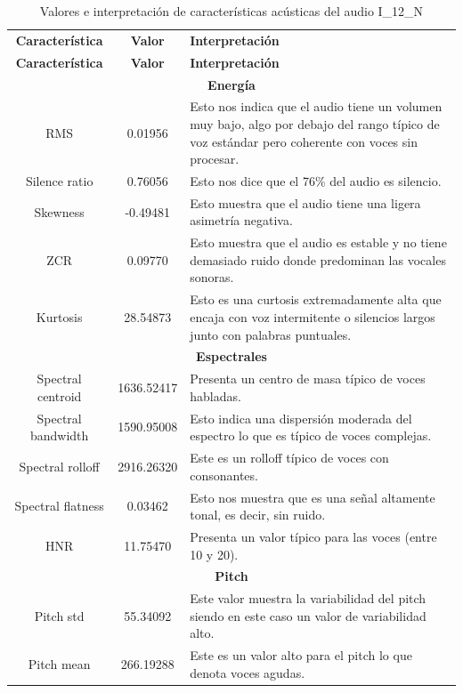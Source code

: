 \begin{longtable}{|c|c|p{8cm}|}
\caption{Características del audio y su interpretación}
\label{tab:caracteristicas_audio} \\
\caption{Valores e interpretación de características acústicas del audio I\_12\_N} \\
\hline
\textbf{Característica} & \textbf{Valor} & \textbf{Interpretación} \\ \hline
\endfirsthead

\hline
\textbf{Característica} & \textbf{Valor} & \textbf{Interpretación} \\ \hline
\endhead

\hline
\multicolumn{3}{|c|}{\textbf{Energía}} \\ \hline
RMS & 0.01956 & Esto nos indica que el audio tiene un volumen muy bajo, algo por debajo del rango típico de voz estándar pero coherente con voces sin procesar. \\ \hline
Silence ratio & 0.76056 & Esto nos dice que el 76\% del audio es silencio. \\ \hline
Skewness & -0.49481 & Esto muestra que el audio tiene una ligera asimetría negativa. \\ \hline
ZCR & 0.09770 & Esto muestra que el audio es estable y no tiene demasiado ruido donde predominan las vocales sonoras. \\ \hline
Kurtosis & 28.54873 & Esto es una curtosis extremadamente alta que encaja con voz intermitente o silencios largos junto con palabras puntuales. \\ \hline

\multicolumn{3}{|c|}{\textbf{Espectrales}} \\ \hline
Spectral centroid & 1636.52417 & Presenta un centro de masa típico de voces habladas. \\ \hline
Spectral bandwidth & 1590.95008 & Esto indica una dispersión moderada del espectro lo que es típico de voces complejas. \\ \hline
Spectral rolloff & 2916.26320 & Este es un rolloff típico de voces con consonantes. \\ \hline
Spectral flatness & 0.03462 & Esto nos muestra que es una señal altamente tonal, es decir, sin ruido. \\ \hline
HNR & 11.75470 & Presenta un valor típico para las voces (entre 10 y 20). \\ \hline

\multicolumn{3}{|c|}{\textbf{Pitch}} \\ \hline
Pitch std & 55.34092 & Este valor muestra la variabilidad del pitch siendo en este caso un valor de variabilidad alto. \\ \hline
Pitch mean & 266.19288 & Este es un valor alto para el pitch lo que denota voces agudas. \\ \hline


\end{longtable}
